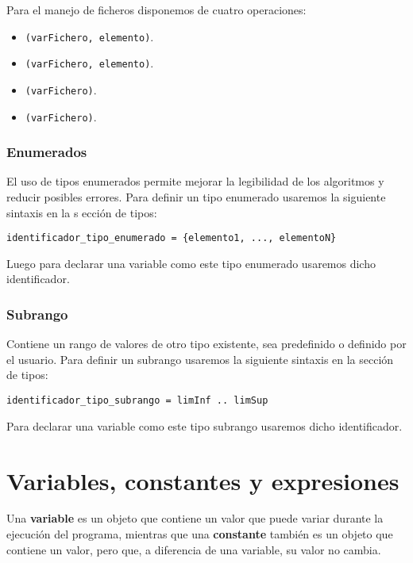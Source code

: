 \documentclass{article}
\begin{document}
Para el manejo de ficheros disponemos de cuatro operaciones:

\begin{itemize}
\item {}\texttt{(varFichero, elemento)}.
\item {}\texttt{(varFichero, elemento)}.
\item {}\texttt{(varFichero)}.
\item {}\texttt{(varFichero)}.
\end{itemize}

\subsubsection{Enumerados}

El uso de tipos enumerados permite mejorar la legibilidad de los algoritmos y reducir posibles errores. Para definir un tipo enumerado usaremos la siguiente sintaxis en la s
ección de tipos:

\begin{lstlisting}[language = pseudocodigoesp]
identificador_tipo_enumerado = {elemento1, ..., elementoN}
\end{lstlisting}

Luego para declarar una variable como este tipo enumerado usaremos dicho identificador.

\subsubsection{Subrango}
Contiene un rango de valores de otro tipo existente, sea predefinido o definido por el usuario. Para definir un subrango usaremos la siguiente sintaxis en la sección de tipos:

\begin{lstlisting}[language = pseudocodigoesp]
identificador_tipo_subrango = limInf .. limSup
\end{lstlisting}

Para declarar una variable como este tipo subrango usaremos dicho identificador.

\section{Variables, constantes y expresiones}
Una \textbf{variable} es un objeto que contiene un valor que puede variar durante la ejecución del programa, mientras que una \textbf{constante} también es un objeto que contiene un valor, pero que, a diferencia de una variable, su valor no cambia.
\end{document}
